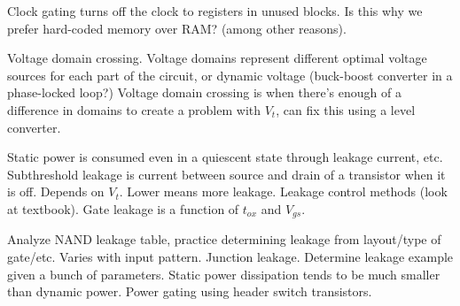 \documentclass{article}
\begin{document}
Clock gating turns off the clock to registers in unused blocks. Is this why we prefer hard-coded memory over RAM? (among other reasons). 

Voltage domain crossing. Voltage domains represent different optimal voltage sources for each part of the circuit, or dynamic voltage (buck-boost converter in a phase-locked loop?) Voltage domain crossing is when there's enough of a difference in domains to create a problem with \(V_t\), can fix this using a level converter. 

Static power is consumed even in a quiescent state through leakage current, etc. Subthreshold leakage is current between source and drain of a transistor when it is off. Depends on \(V_{t}\). Lower means more leakage. Leakage control methods (look at textbook). Gate leakage is a function of \(t_{ox}\) and \(V_{gs}\). 

Analyze NAND leakage table, practice determining leakage from layout/type of gate/etc. Varies with input pattern. Junction leakage. Determine leakage example given a bunch of parameters. Static power dissipation tends to be much smaller than dynamic power. Power gating using header switch transistors.
\end{document}
